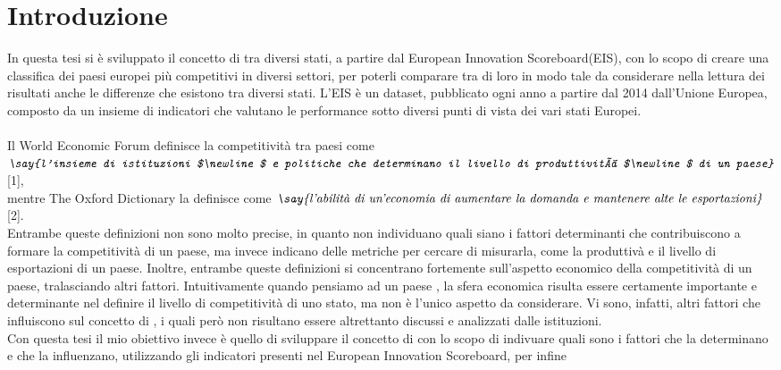 \documentclass[a4paper,12pt, openright]{report}
\begin{document}
\chapter{Introduzione}

In questa tesi si è sviluppato il concetto di  tra diversi stati, a partire dal European Innovation Scoreboard(EIS),
con lo scopo di creare una classifica dei paesi europei più competitivi in diversi settori, per poterli comparare tra di 
loro in modo tale da considerare nella 
lettura dei risultati anche 
le differenze 
che esistono tra diversi stati.  
L'EIS è un dataset, pubblicato ogni anno a partire dal 2014 dall'Unione Europea, composto da un insieme di indicatori che 
valutano 
le performance sotto diversi punti di vista dei vari stati Europei.  \\
\\
Il World Economic Forum definisce la competitività tra paesi come \linebreak
$\textit{\say{l'insieme di istituzioni $\newline$ e politiche che determinano 
il livello di produttività $\newline$ di un paese}}$[1], \\ mentre The Oxford Dictionary la definisce come  \linebreak
$\textit{\say{l'abilità di un'economia di aumentare la domanda e mantenere alte le esportazioni}}$[2]. \\
Entrambe queste definizioni non sono molto precise, in quanto non individuano quali siano i fattori determinanti che contribuiscono a 
formare la competitività di un paese, ma invece indicano delle metriche per cercare di misurarla, come la produttivà e il livello 
di esportazioni di un paese. Inoltre, entrambe queste definizioni si concentrano fortemente sull'aspetto economico della competitività di un paese, tralasciando altri fattori. Intuitivamente 
quando pensiamo ad un paese , la sfera economica risulta essere certamente importante e determinante nel 
definire il livello di competitività di uno stato, ma non è l'unico aspetto da considerare. Vi sono, infatti, altri fattori che
influiscono sul concetto di , i quali però non risultano essere altrettanto discussi e analizzati dalle 
istituzioni.  \\
Con questa tesi il mio obiettivo invece è quello di sviluppare il concetto di  con lo scopo di indivuare quali sono i 
fattori che la determinano e che la influenzano, utilizzando gli indicatori presenti nel European Innovation Scoreboard, per infine 
\end{document}

